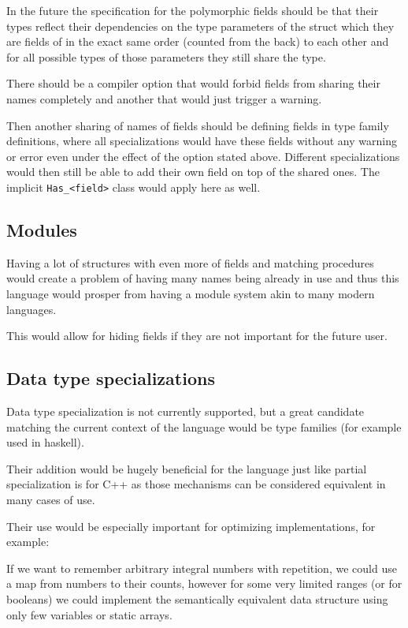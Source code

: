 In the future the specification for the polymorphic fields should be that their types reflect their dependencies on the type
parameters of the struct which they are fields of in the exact same order (counted from the back) to each other and for all possible types of those parameters they
still share the type.

There should be a compiler option that would forbid fields from sharing their names completely and another that would just trigger a warning.

Then another sharing of names of fields should be defining fields in type family definitions, where all specializations would
have these fields without any warning or error even under the effect of the option stated above. Different specializations would
then still be able to add their own field on top of the shared ones. The implicit \lstinline{Has_<field>} class would apply here as well.

\subsection{Modules}

Having a lot of structures with even more of fields and matching procedures would create a problem of having many names being already
in use and thus this language would prosper from having a module system akin to many modern languages.

This would allow for hiding fields if they are not important for the future user.

\subsection{Data type specializations}

Data type specialization is not currently supported, but a great candidate matching the current context of the language would be
type families (for example used in haskell).

Their addition would be hugely beneficial for the language just like partial specialization is for C++ as
those mechanisms can be considered equivalent in many cases of use.

Their use would be especially important for optimizing implementations, for example:

If we want to remember arbitrary integral numbers with repetition, we could use a map from numbers to their counts,
however for some very limited ranges (or for booleans) we could implement the semantically equivalent data structure using
only few variables or static arrays.

